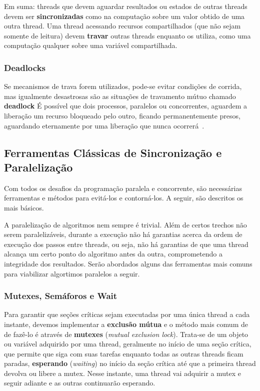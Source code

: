 \documentclass[12pt,a4paper]{article}
\begin{document}
Em suma: threads que devem aguardar resultados ou estados de outras threads devem ser \textbf{sincronizadas} como na computação sobre um valor obtido de uma outra thread. Uma thread acessando recursos compartilhados (que não sejam somente de leitura) devem \textbf{travar} outras threads enquanto os utiliza, como uma computação qualquer sobre uma variável compartilhada.

\subsubsection{Deadlocks}
\label{sssec:deadlock}

Se mecanismos de trava forem utilizados, pode-se evitar condições de corrida, mas igualmente desastrosas são as situações de travamento mútuo chamado \textbf{deadlock} É possível que dois processos, paralelos ou concorrentes, aguardem a liberação um recurso bloqueado pelo outro, ficando permanentemente presos, aguardando eternamente por uma liberação que nunca ocorrerá~\cite{pacheco11}.

\subsection{Ferramentas Clássicas de Sincronização e Paralelização}
\label{ssec:ferramentas classicas sincronizacao paralelizacao}
Com todos os desafios da programação paralela e concorrente, são necessárias ferramentas e métodos para evitá-los e contorná-los. A seguir, são descritos os mais básicos.

A paralelização de algoritmos nem sempre é trivial. Além de certos trechos não serem paralelizáveis, durante a execução não há garantias acerca da ordem de execução dos passos entre threads, ou seja, não há garantias de que uma thread alcança um certo ponto do algoritmo antes da outra, comprometendo a integridade dos resultados. Serão abordados alguns das ferramentas mais comuns para viabilizar algortimos paralelos a seguir.

\subsubsection{Mutexes, Semáforos e Wait}
\label{sssec:mutexes semaforos wait}

Para garantir que seções críticas sejam executadas por uma única thread a cada instante, devemos implementar a \textbf{exclusão mútua} e o método mais comum de de fazê-lo é através de \textbf{mutexes} ({\it mutual exclusion lock}). Trata-se de um objeto ou variável adquirido por uma thread, geralmente no início de uma seção crítica, que permite que siga com suas tarefas enquanto todas as outras threads ficam paradas, \textbf{esperando} ({\it waiting}) no início da seção crítica até que a primeira thread devolva ou libere a mutex. Nesse instante, uma thread vai adquirir a mutex e seguir adiante e as outras continuarão esperando.
\end{document}
